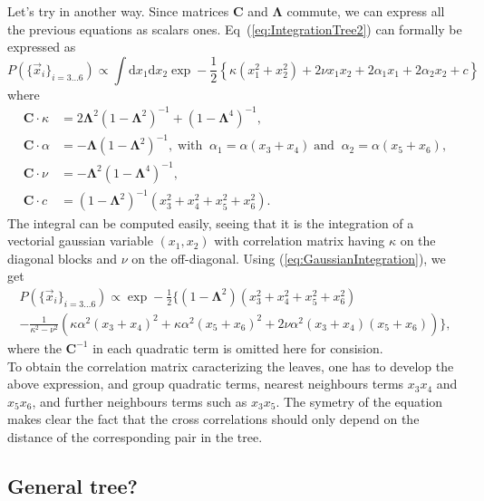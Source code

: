 \documentclass[10pt]{article}
\newcommand{\ddroit}{\textrm{d}}
\newcommand{\Lam}{\bm{\Lambda}}
\newcommand{\xk}[1]{\vec{x}_{#1}}
\begin{document}
Let's try in another way. Since matrices $\bm{C}$ and $\Lam$ commute, we can express all the previous equations as scalars ones. Eq~(\ref{eq:IntegrationTree2}) can formally be expressed as 
\begin{equation}
\label{eq:Tree2Scalar}
    P(\{\xk{i}\}_{i=3\ldots 6}) \propto \int\ddroit x_1\ddroit x_2 \exp-\frac{1}{2}\left\{\kappa \left(x_1^2+x_2^2\right) +2\nu x_1x_2 + 2\alpha_1 x_1 + 2\alpha_2 x_2 + c  \right\}
\end{equation}  
where
\begin{align*}
  \bm{C}\cdot\kappa &= 2\Lam^2(1-\Lam^2)^{-1} + (1-\Lam^4)^{-1},\\
  \bm{C}\cdot\alpha &= -\Lam(1-\Lam^2)^{-1},\;\text{with}\;\; \alpha_1 = \alpha(x_3+x_4) \;\text{and}\;\; \alpha_2 = \alpha(x_5+x_6),\\
  \bm{C}\cdot\nu &= -\Lam^2(1-\Lam^4)^{-1},\\
  \bm{C}\cdot c &= (1-\Lam^2)^{-1}(x_3^2+x_4^2+x_5^2+x_6^2).
\end{align*}
The integral can be computed easily, seeing that it is the integration of a vectorial gaussian variable $(x_1,x_2)$ with correlation matrix having $\kappa$ on the diagonal blocks and $\nu$ on the off-diagonal. Using (\ref{eq:GaussianIntegration}), we get
\begin{multline}
  \label{eq:Tree2HalfInt}
  P(\{\xk{i}\}_{i=3\ldots 6}) \propto \exp-\frac{1}{2}\Big\{ (1-\Lam^2)(x_3^2+x_4^2+x_5^2+x_6^2) \\ - \frac{1}{\kappa^2 - \nu^2}\left( \kappa\alpha^2(x_3+x_4)^2+\kappa\alpha^2(x_5+x_6)^2+2\nu\alpha^2(x_3+x_4)(x_5+x_6) \right)\Big\},
\end{multline}
where the $\bm{C}^{-1}$ in each quadratic term is omitted here for consision.\\
To obtain the correlation matrix caracterizing the leaves, one has to develop the above expression, and group quadratic terms, nearest neighbours terms $x_3x_4$ and $x_5x_6$, and further neighbours terms such as $x_3x_5$. The symetry of the equation makes clear the fact that the cross correlations should only depend on the distance of the corresponding pair in the tree. 


\subsection{General tree?} %
\label{sub:general_tree_}
\end{document}
